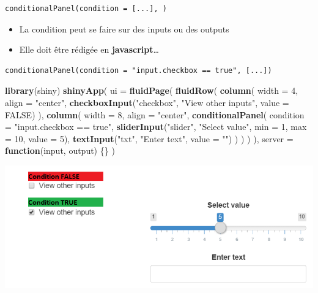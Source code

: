 \documentclass[
]{article}
\newenvironment{Shaded}{\begin{snugshade}}{\end{snugshade}}
\newcommand{\AttributeTok}[1]{\textcolor[rgb]{0.13,0.29,0.53}{#1}}
\newcommand{\ConstantTok}[1]{\textcolor[rgb]{0.56,0.35,0.01}{#1}}
\newcommand{\ControlFlowTok}[1]{\textcolor[rgb]{0.13,0.29,0.53}{\textbf{#1}}}
\newcommand{\DecValTok}[1]{\textcolor[rgb]{0.00,0.00,0.81}{#1}}
\newcommand{\FunctionTok}[1]{\textcolor[rgb]{0.13,0.29,0.53}{\textbf{#1}}}
\newcommand{\NormalTok}[1]{#1}
\newcommand{\StringTok}[1]{\textcolor[rgb]{0.31,0.60,0.02}{#1}}
\providecommand{\tightlist}{%
  \setlength{\itemsep}{0pt}\setlength{\parskip}{0pt}}
\begin{document}
\begin{verbatim}
conditionalPanel(condition = [...], )
\end{verbatim}

\begin{itemize}
\tightlist
\item
  La condition peut se faire sur des inputs ou des outputs
\item
  Elle doit être rédigée en \textbf{javascript}\ldots{}
\end{itemize}

\begin{verbatim}
conditionalPanel(condition = "input.checkbox == true", [...])
\end{verbatim}

\begin{Shaded}
\begin{Highlighting}[]
\FunctionTok{library}\NormalTok{(shiny)}
\FunctionTok{shinyApp}\NormalTok{(}
  \AttributeTok{ui =} \FunctionTok{fluidPage}\NormalTok{(}
    \FunctionTok{fluidRow}\NormalTok{(}
      \FunctionTok{column}\NormalTok{(}
        \AttributeTok{width =} \DecValTok{4}\NormalTok{,}
        \AttributeTok{align =} \StringTok{"center"}\NormalTok{,}
        \FunctionTok{checkboxInput}\NormalTok{(}\StringTok{"checkbox"}\NormalTok{, }\StringTok{"View other inputs"}\NormalTok{, }\AttributeTok{value =} \ConstantTok{FALSE}\NormalTok{)}
\NormalTok{      ),}
      \FunctionTok{column}\NormalTok{(}
        \AttributeTok{width =} \DecValTok{8}\NormalTok{,}
        \AttributeTok{align =} \StringTok{"center"}\NormalTok{,}
        \FunctionTok{conditionalPanel}\NormalTok{(}
          \AttributeTok{condition =} \StringTok{"input.checkbox == true"}\NormalTok{, }
          \FunctionTok{sliderInput}\NormalTok{(}\StringTok{"slider"}\NormalTok{, }\StringTok{"Select value"}\NormalTok{, }\AttributeTok{min =} \DecValTok{1}\NormalTok{, }\AttributeTok{max =} \DecValTok{10}\NormalTok{, }\AttributeTok{value =} \DecValTok{5}\NormalTok{),}
          \FunctionTok{textInput}\NormalTok{(}\StringTok{"txt"}\NormalTok{, }\StringTok{"Enter text"}\NormalTok{, }\AttributeTok{value =} \StringTok{""}\NormalTok{)}
\NormalTok{        )}
\NormalTok{      )}
\NormalTok{    )}
\NormalTok{  ),}
  \AttributeTok{server =} \ControlFlowTok{function}\NormalTok{(input, output) \{\}}
\NormalTok{)}
\end{Highlighting}
\end{Shaded}

\includegraphics{img/cond1.png}
\end{document}
